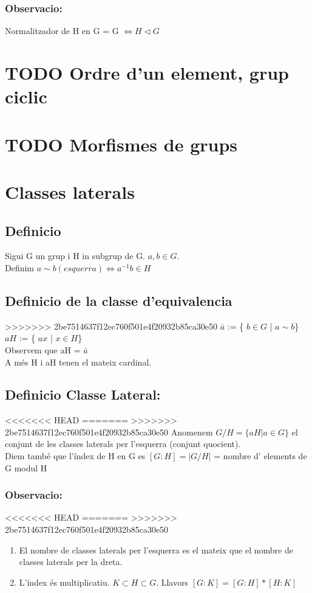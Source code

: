 \documentclass[11pt]{article}
\begin{document}
\subsubsection{Observacio:}
\label{sec:orgb61e528}
Normalitzador de H en G = G \(\iff H \vartriangleleft G\)
\section{{\bfseries\sffamily TODO} Ordre d'un element, grup ciclic}
\label{sec:org8fbc9a1}
\section{{\bfseries\sffamily TODO} Morfismes de grups}
\label{sec:orga1cb53e}
\section{Classes laterals}
\label{sec:orgcc06de2}
\subsection{Definicio}
\label{sec:orge22c4b2}
Sigui G un grup i H in subgrup de G. \(a,b \in G\). \\
Definim \(a \sim b (esquerra) \iff a^{-1}b \in H\)
\subsection{Definicio de la classe d'equivalencia}
\label{sec:orgdbca37a}
>>>>>>> 2be7514637f12ec760f501e4f20932b85ca30e50
\(\bar{a}\) := \{ \(b \in G\) | \(a \sim b\)\} \\
\(aH\) := \{ \(ax\) | \(x \in H\)\} \\
Observem que aH = \(\bar{a}\) \\
A més H i aH tenen el mateix cardinal.

\subsection{Definicio Classe Lateral:}
<<<<<<< HEAD
\label{sec:orgf656255}
=======
\label{sec:org4564883}
>>>>>>> 2be7514637f12ec760f501e4f20932b85ca30e50
Anomenem \(G/H = \{aH | a \in G\}\) el conjunt de les classes laterals per l'esquerra (conjunt quocient). \\
Diem també que l'índex de H en G es \([G:H] = |G/H|\) = nombre d' elements de G modul H

\subsubsection{Observacio:}
<<<<<<< HEAD
\label{sec:orgd9bfe68}
=======
\label{sec:org4d34938}
>>>>>>> 2be7514637f12ec760f501e4f20932b85ca30e50
\begin{enumerate}
\item El nombre de classes laterals per l'esquerra es el mateix que el nombre de classes laterals per la dreta.
\item L'índex és multiplicatiu. \(K \subset H \subset G\). Llavors \([G:K] = [G:H] * [H:K]\)
\end{enumerate}
\end{document}
